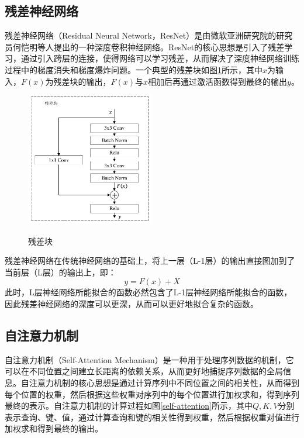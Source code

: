 \subsection{残差神经网络} 
残差神经网络（Residual Neural Network，ResNet）是由微软亚洲研究院的研究员何恺明等人提出的一种深度卷积神经网络。ResNet的核心思想是引入了残差学习，通过引入跨层的连接，使得网络可以学习残差，从而解决了深度神经网络训练过程中的梯度消失和梯度爆炸问题。一个典型的残差块如图\ref{ResidualBlock}所示，其中$x$为输入，$F(x)$为残差块的输出，$F(x)$与$x$相加后再通过激活函数得到最终的输出$y$。
\begin{figure}[htbp]
	\centering
	\includegraphics[width=0.5\textwidth]{figures/残差块.pdf}\\
	\caption{残差块}
	\label{ResidualBlock}
\end{figure}
残差神经网络在传统神经网络的基础上，将上一层（L-1层）的输出直接图加到了当前层（L层）的输出上，即：
\begin{equation}
	y = F(x) + X
\end{equation}
此时，L层神经网络所能拟合的函数必然包含了L-1层神经网络所能拟合的函数，因此残差神经网络的深度可以更深，从而可以更好地拟合复杂的函数。

\subsection{自注意力机制}
自注意力机制（Self-Attention Mechanism）是一种用于处理序列数据的机制，它可以在不同位置之间建立长距离的依赖关系，从而更好地捕捉序列数据的全局信息。自注意力机制的核心思想是通过计算序列中不同位置之间的相关性，从而得到每个位置的权重，然后根据这些权重对序列中的每个位置进行加权求和，得到序列最终的表示。自注意力机制的计算过程如图\ref{self-attention}所示，其中$Q,K,V$分别表示查询、键、值，通过计算查询和键的相关性得到权重，然后根据权重对值进行加权求和得到最终的输出。



